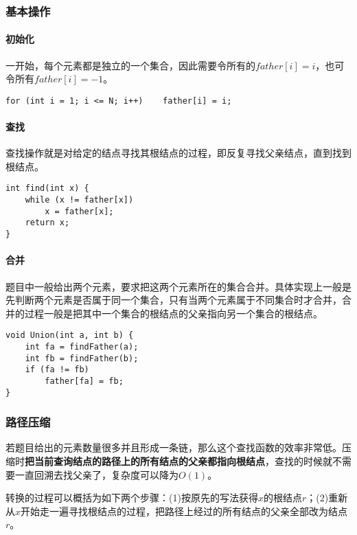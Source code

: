 \subsubsection{基本操作}

\paragraph{初始化}

一开始，每个元素都是独立的一个集合，因此需要令所有的$father[i]=i$，也可令所有$father[i]=-1$。

\begin{lstlisting}
for (int i = 1; i <= N; i++)	father[i] = i;
\end{lstlisting}

\paragraph{查找}

查找操作就是对给定的结点寻找其根结点的过程，即反复寻找父亲结点，直到找到根结点。

\begin{lstlisting}
int find(int x) {
	while (x != father[x])
		x = father[x];
	return x;
}
\end{lstlisting}

\paragraph{合并}

题目中一般给出两个元素，要求把这两个元素所在的集合合并。具体实现上一般是先判断两个元素是否属于同一个集合，只有当两个元素属于不同集合时才合并，合并的过程一般是把其中一个集合的根结点的父亲指向另一个集合的根结点。

\begin{lstlisting}
void Union(int a, int b) {
	int fa = findFather(a);
	int fb = findFather(b);
	if (fa != fb)
		father[fa] = fb;
}
\end{lstlisting}

\subsubsection{路径压缩}

若题目给出的元素数量很多并且形成一条链，那么这个查找函数的效率非常低。压缩时\textbf{把当前查询结点的路径上的所有结点的父亲都指向根结点}，查找的时候就不需要一直回溯去找父亲了，复杂度可以降为$O(1)$。

转换的过程可以概括为如下两个步骤：(1)按原先的写法获得$x$的根结点$r$；(2)重新从$x$开始走一遍寻找根结点的过程，把路径上经过的所有结点的父亲全部改为结点$r$。

